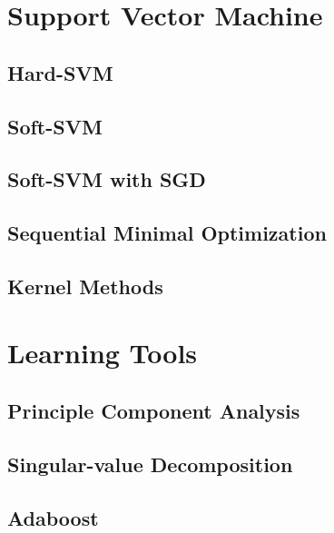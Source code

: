 \documentclass{book}
\begin{document}
\chapter{Support Vector Machine}
\section{Hard-SVM}
    
\medskip
\section{Soft-SVM}
    
\medskip
\section{Soft-SVM with SGD}
    
\medskip
\section{Sequential Minimal Optimization}
    
\medskip
\section{Kernel Methods}
    
\medskip

\chapter{Learning Tools}
\section{Principle Component Analysis}
    
\medskip
\section{Singular-value Decomposition}
\medskip
\section{Adaboost}
\medskip

\printindex
\end{document}
